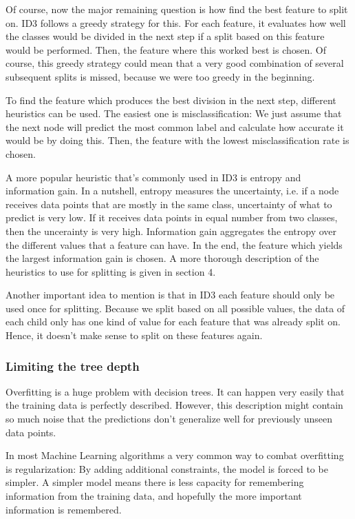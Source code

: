 \documentclass[a4paper]{article}
\begin{document}
Of course, now the major remaining question is how find the best feature to split on. ID3 follows a greedy strategy for this. For each feature, it evaluates how well the classes would be divided in the next step if a split based on this feature would be performed. Then, the feature where this worked best is chosen. Of course, this greedy strategy could mean that a very good combination of several subsequent splits is missed, because we were too greedy in the beginning.

To find the feature which produces the best division in the next step, different heuristics can be used. The easiest one is misclassification: We just assume that the next node will predict the most common label and calculate how accurate it would be by doing this. Then, the feature with the lowest misclassification rate is chosen.

A more popular heuristic that's commonly used in ID3 is entropy and information gain. In a nutshell, entropy measures the uncertainty, i.e. if a node receives data points that are mostly in the same class, uncertainty of what to predict is very low. If it receives data points in equal number from two classes, then the uncerainty is very high. Information gain aggregates the entropy over the different values that a feature can have. In the end, the feature which yields the largest information gain is chosen. A more thorough description of the heuristics to use for splitting is given in section 4.

Another important idea to mention is that in ID3 each feature should only be used once for splitting. Because we split based on all possible values, the data of each child only has one kind of value for each feature that was already split on. Hence, it doesn't make sense to split on these features again.

\subsubsection{Limiting the tree depth}

Overfitting is a huge problem with decision trees. It can happen very easily that the training data is perfectly described. However, this description might contain so much noise that the predictions don't generalize well for previously unseen data points.

In most Machine Learning algorithms a very common way to combat overfitting is regularization: By adding additional constraints, the model is forced to be simpler. A simpler model means there is less capacity for remembering information from the training data, and hopefully the more important information is remembered.
\end{document}
